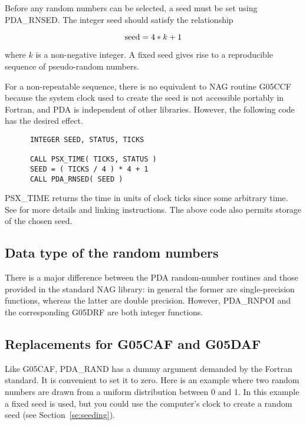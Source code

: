    Before any random numbers can be selected, a seed must be set
   using PDA\_RNSED.  The integer seed should satisfy the relationship

   \[ {\rm seed} = 4 * k + 1 \]

   where $k$ is a non-negative integer.  A fixed seed gives rise to a
   reproducible sequence of pseudo-random numbers.

   For a non-repeatable sequence, there is no equivalent to NAG
   routine G05CCF because the system clock used to create the seed is
   not accessible portably in Fortran, and PDA is independent of other
   libraries.  However, the following code has the desired effect.

\begin{verbatim}
      INTEGER SEED, STATUS, TICKS

      CALL PSX_TIME( TICKS, STATUS )
      SEED = ( TICKS / 4 ) * 4 + 1
      CALL PDA_RNSED( SEED )
\end{verbatim}

   PSX\_TIME returns the time in units of clock ticks since some
   arbitrary time.  See  for more details and
   linking instructions.  The above code also permits storage of
   the chosen seed.

\subsection{Data type of the random numbers}

   There is a major difference between the PDA random-number routines
   and those provided in the standard NAG library: in general the
   former are single-precision functions, whereas the latter are
   double precision.  However, PDA\_RNPOI and the corresponding G05DRF
   are both integer functions.

\subsection{Replacements for G05CAF and G05DAF}

   Like G05CAF, PDA\_RAND has a dummy argument demanded by the Fortran
   standard.  It is convenient to set it to zero.  Here is an example
   where two random numbers are drawn from a uniform distribution
   between 0 and 1.  In this example a fixed seed is used, but you
   could use the computer's clock to create a random seed (see
   Section~\ref{se:seeding}).

